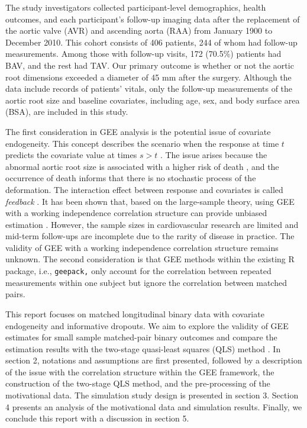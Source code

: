 \documentclass[
]{aft}
\begin{document}
The study investigators collected participant-level demographics, health
outcomes, and each participant's follow-up imaging data after the
replacement of the aortic valve (AVR) and ascending aorta (RAA) from
January 1900 to December 2010. This cohort consists of 406 patients, 244
of whom had follow-up measurements. Among those with follow-up visits,
172 (70.5\%) patients had BAV, and the rest had TAV. Our primary outcome
is whether or not the aortic root dimensions exceeded a diameter of 45
mm after the surgery. Although the data include records of patients'
vitals, only the follow-up measurements of the aortic root size and
baseline covariates, including age, sex, and body surface area (BSA),
are included in this study.

The first consideration in GEE analysis is the potential issue of
covariate endogeneity. This concept describes the scenario when the
response at time \(t\) predicts the covariate value at times \(s > t\)
\citep{Diggle2002}. The issue arises because the abnormal aortic root
size is associated with a higher risk of death \citep{KITAGAWA2013258},
and the occurrence of death informs that there is no stochastic process
of the deformation. The interaction effect between response and
covariates is called \emph{feedback} \citep{Zeger1991}. It has been
shown that, based on the large-sample theory, using GEE with a working
independence correlation structure can provide unbiased estimation
\citep[@LiangZeger1986]{Diggle2002}. However, the sample sizes in
cardiovascular research are limited and mid-term follow-ups are
incomplete due to the rarity of disease in practice. The validity of GEE
with a working independence correlation structure remains unknown. The
second consideration is that GEE methods within the existing R package,
i.e., \texttt{geepack,} only account for the correlation between
repeated measurements within one subject but ignore the correlation
between matched pairs.

This report focuses on matched longitudinal binary data with covariate
endogeneity and informative dropouts. We aim to explore the validity of
GEE estimates for small sample matched-pair binary outcomes and compare
the estimation results with the two-stage quasi-least squares (QLS)
method \citep{Mitani2019}. In section 2, notations and assumptions are
first presented, followed by a description of the issue with the
correlation structure within the GEE framework, the construction of the
two-stage QLS method, and the pre-processing of the motivational data.
The simulation study design is presented in section 3. Section 4
presents an analysis of the motivational data and simulation results.
Finally, we conclude this report with a discussion in section 5.
\end{document}
